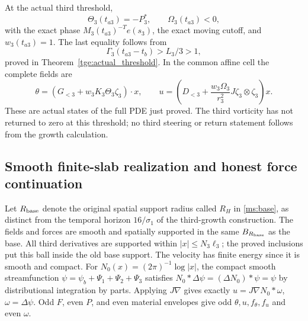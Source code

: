 At the actual third threshold,
\[
 \Theta_3(t_{a3})=-P_3^*,\qquad \Omega_3(t_{a3})<0,
\]
with the exact phase $M_3(t_{a3})^{-T}e(s_3)$, the exact moving
cutoff, and $w_3(t_{a3})=1$. The last equality follows from
\[
 \Gamma_3(t_{a3}-t_b)>L_3/3>1,
\]
proved in
Theorem~\ref{tge:actual_threshold}.
In the common affine cell the complete fields are
\begin{equation}\label{tgs:thresholdfields}
 \theta=(G_{<3}+w_3K_3\Theta_3\zeta_3)\cdot x,
 \qquad
 u=\left(D_{<3}+\frac{w_3\Omega_3}{r_3^2}
                       J\zeta_3\otimes\zeta_3\right)x.
\end{equation}
These are actual states of the full PDE just proved. The third
vorticity has not returned to zero at this threshold; no third
steering or return statement follows from the growth calculation.

\subsection{Smooth finite-slab realization and honest force continuation}

Let $R_{\rm base}$ denote the original spatial support radius
called $R_H$ in \eqref{ms:base}, as distinct from the temporal
horizon $16/\sigma_1$ of the third-growth construction.
The fields and forces are smooth and spatially supported in the
same $B_{R_{\rm base}}$ as the base. All third derivatives are supported
within $|x|\leq N_3\ell_3$; the proved inclusions put this ball
inside the old base support. The velocity has finite energy since
it is smooth and compact. For
$N_0(x)=(2\pi)^{-1}\log|x|$, the compact smooth streamfunction
$\psi=\psi_b+\Psi_1+\Psi_2+\Psi_3$ satisfies
$N_0*\Delta\psi=(\Delta N_0)*\psi=\psi$ by distributional
integration by parts. Applying $J\nabla$ gives exactly
$u=J\nabla N_0*\omega$, $\omega=\Delta\psi$.
Odd $F$, even $P$, and even material envelopes give odd
$\theta,u,f_\theta,f_u$ and even $\omega$.

